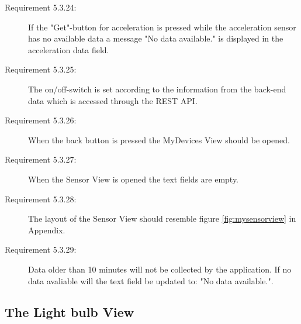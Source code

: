 \documentclass[a4paper]{article}
\begin{document}
\begin{description}
\item[Requirement 5.3.24:] If the "Get"-button for acceleration is pressed while the acceleration sensor has no available data a message "No data available." is displayed in the acceleration data field.

\item[Requirement 5.3.25:] The on/off-switch is set according to the information from the back-end data which is accessed through the REST API.

\item[Requirement 5.3.26:] When the back button is pressed the MyDevices View should be opened.

\item[Requirement 5.3.27:] When the Sensor View is opened the text fields are empty.

\item[Requirement 5.3.28:] The layout of the Sensor View should resemble figure \ref{fig:mysensorview} in Appendix.

\item[Requirement 5.3.29:] Data older than 10 minutes will not be collected by the application. If no data avaliable will the text field be updated to: "No data available.".

\end{description}


\subsection{The Light bulb View}
\end{document}
